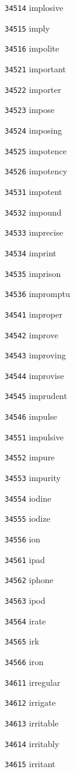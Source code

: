 \documentclass[twoside,11pt]{article}
\begin{document}
\begin{multicols}{5}
\begin{enumerate}
\item[\texttt{34514}] implosive
\item[\texttt{34515}] imply
\item[\texttt{34516}] impolite
\item[\texttt{34521}] important
\item[\texttt{34522}] importer
\item[\texttt{34523}] impose
\item[\texttt{34524}] imposing
\item[\texttt{34525}] impotence
\item[\texttt{34526}] impotency
\item[\texttt{34531}] impotent
\item[\texttt{34532}] impound
\item[\texttt{34533}] imprecise
\item[\texttt{34534}] imprint
\item[\texttt{34535}] imprison
\item[\texttt{34536}] impromptu
\item[\texttt{34541}] improper
\item[\texttt{34542}] improve
\item[\texttt{34543}] improving
\item[\texttt{34544}] improvise
\item[\texttt{34545}] imprudent
\item[\texttt{34546}] impulse
\item[\texttt{34551}] impulsive
\item[\texttt{34552}] impure
\item[\texttt{34553}] impurity
\item[\texttt{34554}] iodine
\item[\texttt{34555}] iodize
\item[\texttt{34556}] ion
\item[\texttt{34561}] ipad
\item[\texttt{34562}] iphone
\item[\texttt{34563}] ipod
\item[\texttt{34564}] irate
\item[\texttt{34565}] irk
\item[\texttt{34566}] iron
\item[\texttt{34611}] irregular
\item[\texttt{34612}] irrigate
\item[\texttt{34613}] irritable
\item[\texttt{34614}] irritably
\item[\texttt{34615}] irritant

\end{enumerate}
\end{multicols}
\end{document}
